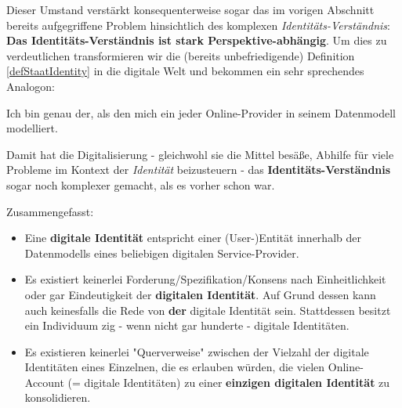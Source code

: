 Dieser Umstand verstärkt konsequenterweise sogar das im vorigen Abschnitt bereits aufgegriffene Problem hinsichtlich des komplexen \textit{Identitäts-Verständnis}: \textbf{Das Identitäts-Verständnis ist stark Perspektive-abhängig}. Um dies zu verdeutlichen transformieren wir die (bereits unbefriedigende) Definition \ref{defStaatIdentity} in die digitale Welt und bekommen ein sehr sprechendes Analogon:

\vspace{0.3cm}

\begin{Business-Def}[Online-Account = (eine) digitale Identität]\label{defAccount}

Ich bin genau der, als den mich ein jeder Online-Provider in seinem Datenmodell modelliert.

\end{Business-Def}

\vspace{0.3cm}

Damit hat die Digitalisierung - gleichwohl sie die Mittel besäße, Abhilfe für viele Probleme im Kontext der \textit{Identität} beizusteuern - das \textbf{Identitäts-Verständnis} sogar noch komplexer gemacht, als es vorher schon war.

Zusammengefasst:

\vspace{0.3cm}

\begin{Fazit}

\begin{itemize}
  \item Eine \textbf{digitale Identität} entspricht einer (User-)Entität innerhalb der Datenmodells eines beliebigen digitalen Service-Provider.
  \item Es existiert keinerlei Forderung/Spezifikation/Konsens nach Einheitlichkeit oder gar Eindeutigkeit der \textbf{digitalen Identität}. Auf Grund dessen kann auch keinesfalls die Rede von \textbf{der} digitale Identität sein. Stattdessen besitzt ein Individuum zig - wenn nicht gar hunderte - digitale Identitäten. 
  \item Es existieren keinerlei "Querverweise" zwischen der Vielzahl der digitale Identitäten eines Einzelnen, die es erlauben würden, die vielen Online-Account (= digitale Identitäten) zu einer \textbf{einzigen digitalen Identität} zu konsolidieren.
\end{itemize}

\end{Fazit}

